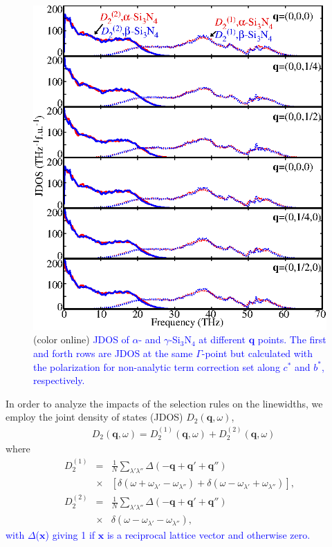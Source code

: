 \documentclass[twocolumn,amsmath,amssymb,a4paper,prb,superscriptaddress,floatfix]{revtex4-1}
\begin{document}
\begin{figure}[ht]
 \centering
  \includegraphics[width=0.9\linewidth]{figure_jdoss.eps} \caption{(color
	  online) \textcolor{blue}{JDOS of $\alpha$- and $\gamma$-Si$_3$N$_4$ at different $\mathbf q$ points.
  The first and forth rows are JDOS at the same $\Gamma$-point but calculated with the polarization for non-analytic term correction set along $c^*$ and $b^*$, respectively.} \label{fig:Fig6_338} }
 \centering
\end{figure}


In order to analyze the impacts of the selection rules on
the linewidths, we employ the joint density of states (JDOS)
${D_2(\mathbf{q},\omega)}$,
\begin{align}
 \label{eq:jdos}
 &D_2(\mathbf{q},\omega) = D_2^{(1)}(\mathbf{q},\omega) +  D_2^{(2)}(\mathbf{q},\omega)
\end{align}
where 
\begin{eqnarray*}
	D_2^{(1)} & = & \frac{1}{N} \sum_{\lambda'\lambda''}\Delta(-\mathbf{q} + \mathbf{q'} + \mathbf{q''}) \nonumber \\
								   & \times & [\delta(\omega + \omega_{\lambda'} - \omega_{\lambda''}) + \delta(\omega - \omega_{\lambda'} + \omega_{\lambda''})],\\
	D_2^{(2)} & = & \frac{1}{N} \sum_{\lambda'\lambda''}\Delta(-\mathbf{q} + \mathbf{q'} + \mathbf{q''}) \nonumber \\
								   & \times & \delta(\omega - \omega_{\lambda'} - \omega_{\lambda''}),
\end{eqnarray*}
\textcolor{blue}{with $\Delta$($\mathbf{x}$) giving 1 if $\mathbf{x}$ is a reciprocal lattice vector and otherwise zero.}
\end{document}
